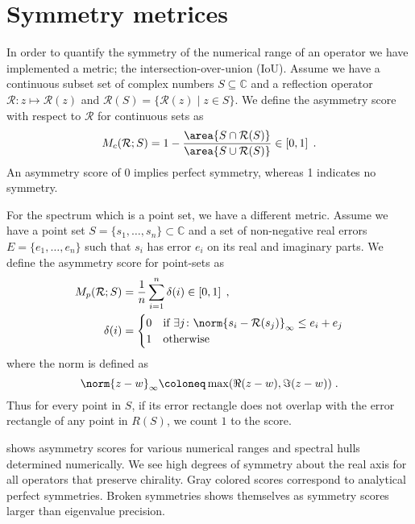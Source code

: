 \chapter{Symmetry metrices}
\label{ch:appendix:symmetries}
\label{ch:appendix:D}


In order to quantify the symmetry of the numerical range of an operator we have implemented a metric; the intersection-over-union (IoU).
Assume we have a continuous subset set of complex numbers $S \subseteq \mathbb{C}$ and a reflection operator $\mathcal{R} \colon z \mapsto \mathcal{R}(z)$ and $\mathcal{R}(S) = \{ \mathcal{R}(z) \mid z \in S \} $.
We define the asymmetry score with respect to $\mathcal{R}$ for continuous sets as
\begin{equation} \label{eq:asymmetry:score:cont}
M_c(\mathcal{R}; S)
= 1-
\frac{\area{ S \cap \mathcal{R}(S) }}
     {\area{ S \cup \mathcal{R}(S) }}
\in \left[ 0, 1 \right] \;.
\end{equation}
An asymmetry score of \num{0} implies perfect symmetry, whereas \num{1} indicates no symmetry.

For the spectrum which is a point set, we have a different metric.
Assume we have a point set $S = \{s_1, \ldots, s_n\} \subset \mathbb{C}$ and a set of non-negative real errors $E = \{e_1, \ldots, e_n\}$ such that $s_i$ has error $e_i$ on its real and imaginary parts.
We define the asymmetry score for point-sets as
\begin{align} \label{eq:asymmetry:score:pt}
M_p(\mathcal{R}; S) &= \frac{1}{n} \sum_{i=1}^{n} \delta(i)
\in \left[ 0, 1 \right] \;, \\
\delta(i) &=
\begin{cases}
    0 & \text{if } \exists j \colon \norm{s_i - \mathcal{R}(s_j)}_{\infty} \leq e_i+e_j \\
    1 & \text{otherwise}
\end{cases}
\end{align}
where the norm is defined as
\begin{equation}
\norm{z - w}_{\infty} \coloneq \max(\Re(z - w), \Im(z - w)) \;.
\end{equation}
Thus for every point in $S$, if its error rectangle does not overlap with the error rectangle of any point in $R(S)$, we count $1$ to the score.

 shows asymmetry scores for various numerical ranges and spectral hulls determined numerically.
We see high degrees of symmetry about the real axis for all operators that preserve chirality.
Gray colored scores correspond to analytical perfect symmetries.
Broken symmetries shows themselves as symmetry scores larger than eigenvalue precision.

